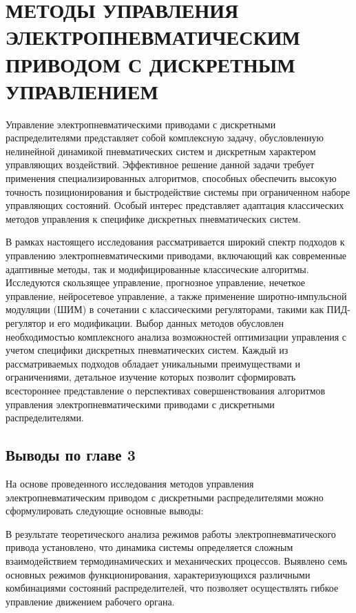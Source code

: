 \chapter{МЕТОДЫ УПРАВЛЕНИЯ ЭЛЕКТРОПНЕВМАТИЧЕСКИМ ПРИВОДОМ С ДИСКРЕТНЫМ УПРАВЛЕНИЕМ}\label{ch:ch3}
Управление электропневматическими приводами с дискретными распределителями представляет
собой комплексную задачу, обусловленную нелинейной динамикой пневматических систем и
дискретным характером управляющих воздействий. Эффективное решение данной задачи требует
применения специализированных алгоритмов, способных обеспечить высокую точность позиционирования и
быстродействие системы при ограниченном наборе управляющих состояний. Особый интерес представляет адаптация
классических методов управления к специфике дискретных пневматических систем.

В рамках настоящего исследования рассматривается широкий спектр подходов к управлению электропневматическими
приводами, включающий как современные адаптивные методы, так и модифицированные
классические алгоритмы. Исследуются скользящее управление, прогнозное управление,
нечеткое управление, нейросетевое управление, а также применение широтно-импульсной модуляции (ШИМ)
в сочетании с классическими регуляторами, такими как ПИД-регулятор и его модификации.
Выбор данных методов обусловлен необходимостью комплексного анализа возможностей оптимизации управления
с учетом специфики дискретных пневматических систем. Каждый из рассматриваемых подходов обладает
уникальными преимуществами и ограничениями, детальное изучение которых позволит сформировать
всестороннее представление о перспективах совершенствования алгоритмов управления
электропневматическими приводами с дискретными распределителями.








\section{Выводы по главе 3}
На основе проведенного исследования методов управления электропневматическим приводом с дискретными распределителями можно сформулировать следующие основные выводы:

В результате теоретического анализа режимов работы электропневматического привода установлено, 
что динамика системы определяется сложным взаимодействием термодинамических и
механических процессов. Выявлено семь основных режимов функционирования, характеризующихся
различными комбинациями состояний распределителей, что позволяет осуществлять
гибкое управление движением рабочего органа.

